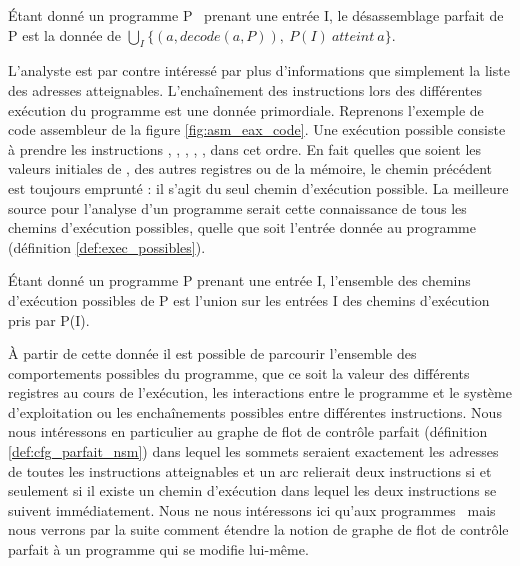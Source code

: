 \begin{defi}
 Étant donné un programme P \nsm\ prenant une entrée I, le désassemblage parfait de P est la donnée de $\bigcup_{I} \{(a, decode(a, P)),\ P(I)\ atteint\ a\}$.
\label{def:desassemblage_parfait_nsm}
\end{defi}

L'analyste est par contre intéressé par plus d'informations que simplement la liste des adresses atteignables. 
L'enchaînement des instructions lors des différentes exécution du programme est une donnée primordiale.
Reprenons l'exemple de code assembleur de la figure \ref{fig:asm_eax_code}. Une exécution possible consiste à prendre les instructions , , , , ,  dans cet ordre. En fait quelles que soient les valeurs initiales de \eax, des autres registres ou de la mémoire, le chemin précédent est toujours emprunté : il s'agit du seul chemin d'exécution possible.
La meilleure source pour l'analyse d'un programme serait cette connaissance de tous les chemins d'exécution possibles, quelle que soit l'entrée donnée au programme (définition \ref{def:exec_possibles}).

\begin{defi}
 Étant donné un programme P prenant une entrée I, l'ensemble des chemins d'exécution possibles de P est l'union sur les entrées I des chemins d'exécution pris par P(I).
\label{def:exec_possibles}
\end{defi}

À partir de cette donnée il est possible de parcourir l'ensemble des comportements possibles du programme, que ce soit la valeur des différents registres au cours de l'exécution, les interactions entre le programme et le système d'exploitation ou les enchaînements possibles entre différentes instructions.
Nous nous intéressons en particulier au graphe de flot de contrôle parfait (définition \ref{def:cfg_parfait_nsm}) dans lequel les sommets seraient exactement les adresses de toutes les instructions atteignables et un arc relierait deux instructions si et seulement si il existe un chemin d'exécution dans lequel les deux instructions se suivent immédiatement.
Nous ne nous intéressons ici qu'aux programmes \nsms\ mais nous verrons par la suite comment étendre la notion de graphe de flot de contrôle parfait à un programme qui se modifie lui-même.

